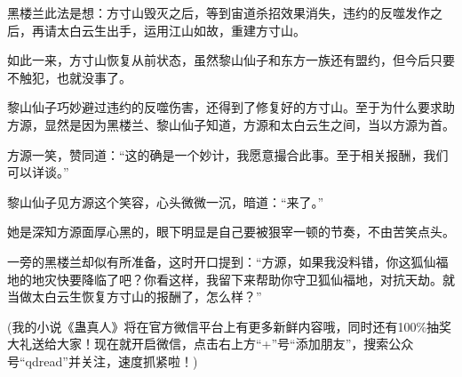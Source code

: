 \begin{this_body}
黑楼兰此法是想：方寸山毁灭之后，等到宙道杀招效果消失，违约的反噬发作之后，再请太白云生出手，运用江山如故，重建方寸山。

如此一来，方寸山恢复从前状态，虽然黎山仙子和东方一族还有盟约，但今后只要不触犯，也就没事了。

黎山仙子巧妙避过违约的反噬伤害，还得到了修复好的方寸山。至于为什么要求助方源，显然是因为黑楼兰、黎山仙子知道，方源和太白云生之间，当以方源为首。

方源一笑，赞同道：“这的确是一个妙计，我愿意撮合此事。至于相关报酬，我们可以详谈。”

黎山仙子见方源这个笑容，心头微微一沉，暗道：“来了。”

她是深知方源面厚心黑的，眼下明显是自己要被狠宰一顿的节奏，不由苦笑点头。

一旁的黑楼兰却似有所准备，这时开口提到：“方源，如果我没料错，你这狐仙福地的地灾快要降临了吧？你看这样，我留下来帮助你守卫狐仙福地，对抗天劫。就当做太白云生恢复方寸山的报酬了，怎么样？”

(我的小说《蛊真人》将在官方微信平台上有更多新鲜内容哦，同时还有100\%抽奖大礼送给大家！现在就开启微信，点击右上方“+”号“添加朋友”，搜索公众号“qdread”并关注，速度抓紧啦！)

\end{this_body}

